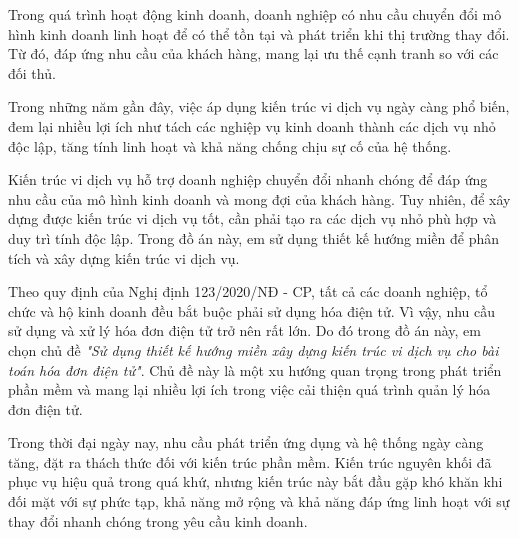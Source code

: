 Trong quá trình hoạt động kinh doanh, doanh nghiệp có nhu cầu chuyển đổi mô hình kinh doanh linh hoạt để có thể tồn tại và phát triển khi thị trường thay đổi. Từ đó, đáp ứng nhu cầu của khách hàng, mang lại ưu thế cạnh tranh so với các đối thủ.

Trong những năm gần đây, việc áp dụng kiến trúc vi dịch vụ ngày càng phổ biến, đem lại nhiều lợi ích như tách các nghiệp vụ kinh doanh thành các dịch vụ nhỏ độc lập, tăng tính linh hoạt và khả năng chống chịu sự cố của hệ thống.

Kiến trúc vi dịch vụ hỗ trợ doanh nghiệp chuyển đổi nhanh chóng để đáp ứng nhu cầu của mô hình kinh doanh và mong đợi của khách hàng. Tuy nhiên, để xây dựng được kiến trúc vi dịch vụ tốt, cần phải tạo ra các dịch vụ nhỏ phù hợp và duy trì tính độc lập. Trong đồ án này, em sử dụng thiết kế hướng miền để phân tích và xây dựng kiến trúc vi dịch vụ.

Theo quy định của Nghị định 123/2020/NĐ - CP, tất cả các doanh nghiệp, tổ chức và hộ kinh doanh đều bắt buộc phải sử dụng hóa điện tử. Vì vậy, nhu cầu sử dụng và xử lý hóa đơn điện tử trở nên rất lớn. Do đó trong đồ án này, em chọn chủ đề \emph{"Sử dụng thiết kế hướng miền xây dựng kiến trúc vi dịch vụ cho bài toán hóa đơn điện tử"}. Chủ đề này là một xu hướng quan trọng trong phát triển phần mềm và mang lại nhiều lợi ích trong việc cải thiện quá trình quản lý hóa đơn điện tử.

%

%

Trong thời đại ngày nay, nhu cầu phát triển ứng dụng và hệ thống ngày càng tăng, đặt ra thách thức đối với kiến trúc phần mềm. Kiến trúc nguyên khối đã phục vụ hiệu quả trong quá khứ, nhưng kiến trúc này bắt đầu gặp khó khăn khi đối mặt với sự phức tạp, khả năng mở rộng và khả năng đáp ứng linh hoạt với sự thay đổi nhanh chóng trong yêu cầu kinh doanh.




